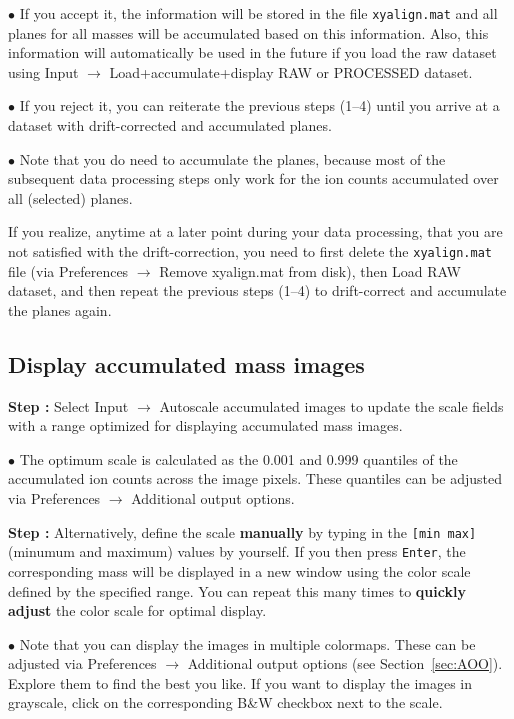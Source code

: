 \documentclass[a4paper, 11pt]{article}
\newcommand{\ttt}[1]{\texttt{#1}}
\newcommand{\lans}[1]{{\color{magenta}#1}}
\newcommand{\lanscb}[1]{{\color{darkgreen}#1}}
\newcommand{\lanstf}[1]{{\color{cyan}#1}}
\newcommand\ra{\rightarrow}
\newcounter{step}
\newcommand\s{\addtocounter{step}{1}\noindent\textbf{Step \thestep:}{ }}
\newcommand\bul{\noindent$\bullet${ }}
\newcommand\bb[1]{\textbf{#1}}
\begin{document}
\bul If you \lans{accept} it, the information will be stored in the file \ttt{xyalign.mat} and all planes for all masses will be accumulated based on this information. Also, this information will automatically be used in the future if you load the raw dataset using \lans{Input} $\ra$ \lans{Load+accumulate+display RAW or PROCESSED dataset}.

\bul If you \lans{reject} it, you can reiterate the previous steps (1--4) until you arrive at a dataset with drift-corrected and accumulated planes.

\bul Note that you do need to accumulate the planes, because most of the subsequent data processing steps only work for the ion counts accumulated over all (selected) planes.

If you realize, anytime at a later point during your data processing, that you are not satisfied with the drift-correction, you need to first delete the \ttt{xyalign.mat} file (via \lans{Preferences} $\ra$ \lans{Remove xyalign.mat from disk}), then \lans{Load RAW dataset}, and then repeat the previous steps (1--4) to drift-correct and accumulate the planes again.


\subsection{Display accumulated mass images}
\setcounter{step}{0}

\s Select \lans{Input} $\ra$ \lans{Autoscale accumulated images} to update the \lanstf{scale} fields with a range optimized for displaying accumulated mass images. 

\bul The optimum scale is calculated as the 0.001 and 0.999 quantiles of the accumulated ion counts across the image pixels. These quantiles can be adjusted via \lans{Preferences} $\ra$ \lans{Additional output options}.

\s Alternatively, define the \lanstf{scale} \bb{manually} by typing in the \ttt{[min max]} (minumum and maximum) values by yourself. If you then press \ttt{Enter}, the corresponding mass will be displayed in a new window using the color scale defined by the specified range. You can repeat this many times to \bb{quickly adjust} the color scale for optimal display.

\bul Note that you can display the images in multiple colormaps. These can be adjusted via \lans{Preferences} $\ra$ \lans{Additional output options} (see Section~\ref{sec:AOO}). Explore them to find the best you like. If you want to display the images in grayscale, click on the corresponding \lanscb{B\&W} checkbox next to the scale.
\end{document}
